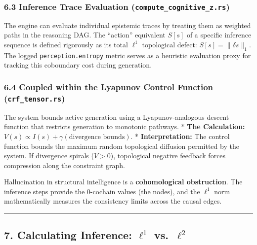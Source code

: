 \documentclass[
]{article}
\begin{document}
\subsubsection{\texorpdfstring{6.3 Inference Trace Evaluation
(\texttt{compute\_cognitive\_z.rs})}{6.3 Inference Trace Evaluation (compute\_cognitive\_z.rs)}}\label{inference-trace-evaluation-compute_cognitive_z.rs}

The engine can evaluate individual epistemic traces by treating them as
weighted paths in the reasoning DAG. The ``action'' equivalent \(S[s]\)
of a specific inference sequence is defined rigorously as its total
\(\ell^1\) topological defect: \(S[s] = \|\delta s\|_1\). The logged
\texttt{perception.entropy} metric serves as a heuristic evaluation
proxy for tracking this coboundary cost during generation.

\subsubsection{\texorpdfstring{6.4 Coupled within the Lyapunov Control
Function
(\texttt{crf\_tensor.rs})}{6.4 Coupled within the Lyapunov Control Function (crf\_tensor.rs)}}\label{coupled-within-the-lyapunov-control-function-crf_tensor.rs}

The system bounds active generation using a Lyapunov-analogous descent
function that restricts generation to monotonic pathways. * \textbf{The
Calculation:} \(V(s) \propto I(s) + \gamma (\text{divergence bounds})\).
* \textbf{Interpretation:} The control function bounds the maximum
random topological diffusion permitted by the system. If divergence
spirals (\(V > 0\)), topological negative feedback forces compression
along the constraint graph.

Hallucination in structural intelligence is a \textbf{cohomological
obstruction}. The inference steps provide the 0-cochain values (the
nodes), and the \(\ell^1\) norm mathematically measures the consistency
limits across the causal edges.

\begin{center}\rule{0.5\linewidth}{0.5pt}\end{center}

\subsection{\texorpdfstring{7. Calculating Inference: \(\ell^1\)
vs.~\(\ell^2\)}{7. Calculating Inference: \textbackslash ell\^{}1 vs.~\textbackslash ell\^{}2}}\label{calculating-inference-ell1-vs.-ell2}
\end{document}
